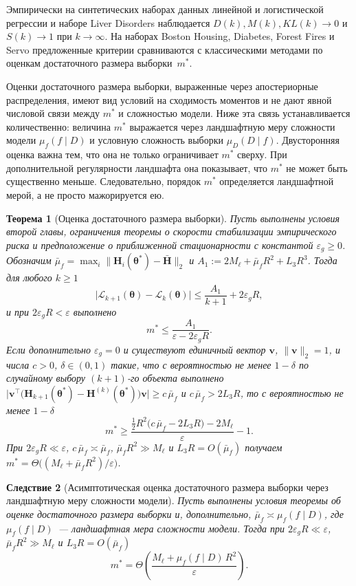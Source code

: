 \documentclass{dissert}
\newtheorem{theorem}{Теорема}
\newtheorem{corollary}[theorem]{Следствие}
\begin{document}
Эмпирически на синтетических наборах данных линейной и логистической регрессии и наборе Liver Disorders наблюдается $D(k),M(k),KL(k)\to 0$ и $S(k)\to 1$ при $k\to\infty$. На наборах Boston Housing, Diabetes, Forest Fires и Servo предложенные критерии сравниваются с классическими методами по оценкам достаточного размера выборки~$m^*$.

Оценки достаточного размера выборки, выраженные через апостериорные распределения, имеют вид условий на сходимость моментов и не дают явной числовой связи между $m^*$ и сложностью модели.
Ниже эта связь устанавливается количественно: величина $m^*$ выражается через ландшафтную меру сложности модели $\mu_f(f\mid D)$ и условную сложность выборки $\mu_D(D\mid f)$.
Двусторонняя оценка важна тем, что она не только ограничивает $m^*$ сверху.
При дополнительной регулярности ландшафта она показывает, что $m^*$ не может быть существенно меньше.
Следовательно, порядок $m^*$ определяется ландшафтной мерой, а не просто мажорируется ею.

\begin{theorem}[Оценка достаточного размера выборки]
Пусть выполнены условия второй главы, ограничения теоремы о скорости стабилизации эмпирического риска и предположение о приближенной стационарности с константой $\varepsilon_g\ge 0$.
Обозначим $\bar\mu_f=\max_i\bigl\|\mathbf{H}_i(\boldsymbol{\theta}^*)-\bar{\mathbf{H}}\bigr\|_2$ и $A_1:=2M_\ell+\bar\mu_f R^2+L_3 R^3$.
Тогда для любого $k\ge 1$
\[
    \bigl|\mathcal{L}_{k+1}(\boldsymbol{\theta})-\mathcal{L}_k(\boldsymbol{\theta})\bigr|
    \le\frac{A_1}{k+1}+2\varepsilon_gR,
\]
и при $2\varepsilon_gR<\varepsilon$ выполнено
\[
    m^*\le\frac{A_1}{\varepsilon-2\varepsilon_gR}.
\]
Если дополнительно $\varepsilon_g=0$ и существуют единичный вектор $\mathbf{v}$, $\|\mathbf{v}\|_2=1$, и числа $c>0$, $\delta\in(0,1)$ такие, что с вероятностью не менее $1-\delta$ по случайному выбору $(k+1)$-го объекта выполнено $\bigl|\mathbf{v}^{\top}\bigl(\mathbf{H}_{k+1}(\boldsymbol{\theta}^*)-\mathbf{H}^{(k)}(\boldsymbol{\theta}^*)\bigr)\mathbf{v}\bigr|\ge c\,\bar\mu_f$ и $c\,\bar\mu_f>2L_3R$, то с вероятностью не менее $1-\delta$
\[
    m^*\ge\frac{\tfrac12 R^2\bigl(c\,\bar\mu_f-2L_3R\bigr)-2M_\ell}{\varepsilon}-1 .
\]
При $2\varepsilon_gR\ll\varepsilon$, $c\,\bar\mu_f\asymp\bar\mu_f$, $\bar\mu_f R^2\gg M_\ell$ и $L_3R=O(\bar\mu_f)$ получаем $m^*=\Theta\bigl((M_\ell+\bar\mu_f R^2)/\varepsilon\bigr)$.
\end{theorem}

\begin{corollary}[Асимптотическая оценка достаточного размера выборки через ландшафтную меру сложности модели]
Пусть выполнены условия теоремы об оценке достаточного размера выборки и, дополнительно, $\bar\mu_f\asymp\mu_f(f\mid D)$, где $\mu_f(f\mid D)$~--- ландшафтная мера сложности модели.
Тогда при $2\varepsilon_gR\ll\varepsilon$, $\bar\mu_f R^2\gg M_\ell$ и $L_3R=O(\bar\mu_f)$
\[
    m^*=\Theta\!\left(\frac{M_\ell+\mu_f(f\mid D)\,R^2}{\varepsilon}\right).
\]
\end{corollary}
\end{document}
